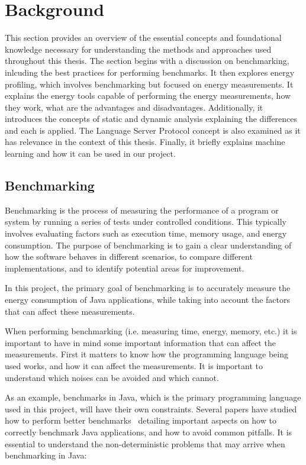 \chapter{Background}\label{chapter:background}

This section provides an overview of the essential concepts and foundational knowledge necessary for understanding the methods and approaches used throughout this thesis. The section begins with a discussion on benchmarking, inlcuding the best practices for performing benchmarks. It then explores energy profiling, which involves benchmarking but focused on energy measurements. It explains the energy tools capable of performing the energy measurements, how they work, what are the advantages and disadvantages. Additionally, it introduces the concepts of static and dynamic analysis explaining the differences and each is applied. The Language Server Protocol concept is also examined as it has relevance in the context of this thesis. Finally, it briefly explains machine learning and how it can be used in our project.


\section{Benchmarking} \label{sec:background_benchmarking}

Benchmarking is the process of measuring the performance of a program or system by running a series of tests under controlled conditions. This typically involves evaluating factors such as execution time, memory usage, and energy consumption. The purpose of benchmarking is to gain a clear understanding of how the software behaves in different scenarios, to compare different implementations, and to identify potential areas for improvement.

In this project, the primary goal of benchmarking is to accurately measure the energy consumption of Java applications, while taking into account the factors that can affect these measurements.

When performing benchmarking (i.e. measuring time, energy, memory, etc.) it is important to have in mind some important information that can affect the measurements. First it matters to know how the programming language being used works, and how it can affect the measurements. It is important to understand which noises can be avoided and which cannot.

As an example, benchmarks in Java, which is the primary programming language used in this project, will have their own constraints. Several papers have studied how to perform better benchmarks~\cite{10.1145/1297027.1297033,10.1145/1167515.1167488} detailing important aspects on how to correctly benchmark Java applications, and how to avoid common pitfalls.
It is essential to understand the non-deterministic problems that may arrive when benchmarking in Java:


